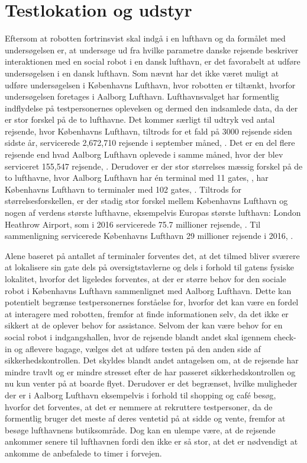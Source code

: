 \section{Testlokation og udstyr}
\label{ParametreTestlokationOgUdstyr}
%
Eftersom at robotten fortrinsvist skal indgå i en lufthavn og da formålet med undersøgelsen er, at undersøge ud fra hvilke parametre danske rejsende beskriver interaktionen med en social robot i en dansk lufthavn, er det favorabelt at udføre undersøgelsen i en dansk lufthavn. Som nævnt har det ikke været muligt at udføre undersøgelsen i Københavns Lufthavn, hvor robotten er tiltænkt, hvorfor undersøgelsen foretages i Aalborg Lufthavn. Lufthavnsvalget har formentlig indflydelse på testpersonernes oplevelsen og dermed den indsamlede data, da der er stor forskel på de to lufthavne. Det kommer særligt til udtryk ved antal rejsende, hvor Københavns Lufthavn, tiltrods for et fald på 3000 rejsende siden sidste år, servicerede 2,672,710 rejsende i september måned, \parencite{WEB:CPHStatistisk}. Det er en del flere rejsende end hvad Aalborg Lufthavn oplevede i samme måned, hvor der blev serviceret 155,547 rejsende, \parencite{WEB:AALStatistik}. Derudover er der stor størrelses mæssig forskel på de to lufthavne, hvor Aalborg Lufthavn har én terminal med 11 gates, \parencite{WEB:AALTerminalOversigt}, har Københavns Lufthavn to terminaler med 102 gates, \parencite{WEB:CPHTerminalOversigt}. Tiltrods for  størrelsesforskellen, er der stadig stor forskel mellem Københavns Lufthavn og nogen af verdens største lufthavne, eksempelvis Europas største lufthavn: London Heathrow Airport, som i 2016 servicerede 75.7 millioner rejsende, \parencite{WEB:HeathrowStatistisk}. Til sammenligning servicerede Københavns Lufthavn 29 millioner rejsende i 2016, \parencite{WEB:CPHStatistiskYear}.

Alene baseret på antallet af terminaler forventes det, at det tilmed bliver sværere at lokalisere sin gate dels på oversigtstavlerne og dels i forhold til gatens fysiske lokalitet, hvorfor det ligeledes forventes, at der er større behov for den sociale robot i Københavns Lufthavn sammenlignet med Aalborg Lufthavn. Dette kan potentielt begrænse testpersonernes forståelse for, hvorfor det kan være en fordel at interagere med robotten, fremfor at finde informationen selv, da det ikke er sikkert at de oplever behov for assistance.\blankline
%
Selvom der kan være behov for en social robot i indgangshallen, hvor de rejsende blandt andet skal igennem check-in og aflevere bagage, vælges det at udføre testen på den anden side af sikkerhedskontrollen. Det skyldes blandt andet antagelsen om, at de rejsende har mindre travlt og er mindre stresset efter de har passeret sikkerhedskontrollen og nu kun venter på at boarde flyet. Derudover er det begrænset, hvilke muligheder der er i Aalborg Lufthavn eksempelvis i forhold til shopping og café besøg, hvorfor det forventes, at det er nemmere at rekruttere testpersoner, da de formentlig bruger det meste af deres ventetid på at sidde og vente, fremfor at besøge lufthavnens butiksområde. Dog kan en ulempe være, at de rejsende ankommer senere til lufthavnen fordi den ikke er så stor, at det er nødvendigt at ankomme de anbefalede to timer i forvejen.

